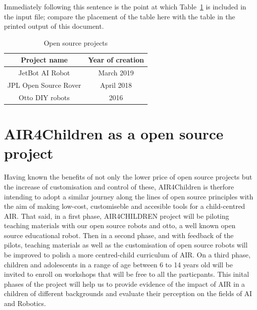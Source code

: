\documentclass[sigconf]{acmart}
\begin{document}

Immediately following this sentence is the point at which
Table~\ref{tab:opensourceprojects} is included in the input file; compare the
placement of the table here with the table in the printed output of
this document.
\begin{table}
  \begin{tabular}{cc}
    \toprule
    Project name & Year of creation \\  %
    \midrule
    JetBot AI Robot \cite{nanoJetBot:2019} & March 2019 \\ %
    JPL Open Source Rover \cite{OSR:2018} & April 2018 \\%
    Otto DIY robots \cite{OttoDIY:2016} & 2016 \\ %
  \bottomrule
\end{tabular}
\caption{Open source projects}
\label{tab:opensourceprojects}
\end{table}

\section{AIR4Children as a open source project}
Having known the benefits of not only the lower price of open source projects but the increase of customisation and control of these, AIR4Children is therfore intending to adopt a similar journey along the lines of open source principles with the aim of making low-cost, customiseble and accesible tools for a child-centred AIR.
That said, in a first phase, AIR4CHILDREN project will be piloting teaching materials with our open source robots and otto, a well known open source educational robot.  
Then in a second phase, and with feedback of the pilots, teaching materials as well as the customisation of open source robots will be improved to polish a more centred-child curriculum of AIR. 
On a third phase, children and adolescents in a range of age between 6 to 14 years old will be invited to enroll on workshops that will be free to all the particpants. 
This inital phases of the project will help us to provide evidence of the impact of AIR in a children of different backgrounds and evaluate their perception on the fields of AI and Robotics.  
\end{document}
